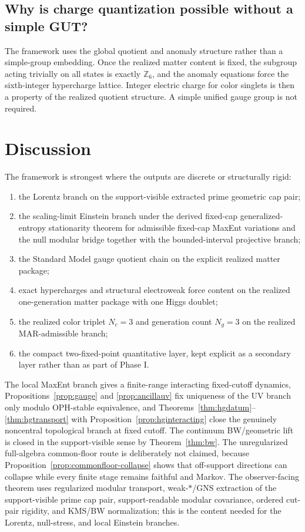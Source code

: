 \documentclass[11pt]{article}
\begin{document}
\subsection{Why is charge quantization possible without a simple GUT?}

The framework uses the global quotient and anomaly structure rather than a simple-group embedding. Once the realized matter content is fixed, the subgroup acting trivially on all states is exactly $\mathbb Z_6$, and the anomaly equations force the sixth-integer hypercharge lattice. Integer electric charge for color singlets is then a property of the realized quotient structure. A simple unified gauge group is not required.

\section{Discussion}

The framework is strongest where the outputs are discrete or structurally rigid:
\begin{enumerate}[leftmargin=2em]
\item the Lorentz branch on the support-visible extracted prime geometric cap pair;
\item the scaling-limit Einstein branch under the derived fixed-cap generalized-entropy stationarity theorem for admissible fixed-cap MaxEnt variations and the null modular bridge together with the bounded-interval projective branch;
\item the Standard Model gauge quotient chain on the explicit realized matter package;
\item exact hypercharges and structural electroweak force content on the realized one-generation matter package with one Higgs doublet;
\item the realized color triplet \(N_c=3\) and generation count \(N_g=3\) on the realized MAR-admissible branch;
\item the compact two-fixed-point quantitative layer, kept explicit as a secondary layer rather than as part of Phase I.
\end{enumerate}

The local MaxEnt branch gives a finite-range interacting fixed-cutoff dynamics, Propositions~\ref{prop:gauge} and \ref{prop:ancillauv} fix uniqueness of the UV branch only modulo OPH-stable equivalence, and Theorems~\ref{thm:hgdatum}--\ref{thm:hgtransport} with Proposition~\ref{prop:hginteracting} close the genuinely noncentral topological branch at fixed cutoff. The continuum BW/geometric lift is closed in the support-visible sense by Theorem~\ref{thm:bw}. The unregularized full-algebra common-floor route is deliberately not claimed, because Proposition~\ref{prop:commonfloor-collapse} shows that off-support directions can collapse while every finite stage remains faithful and Markov. The observer-facing theorem uses regularized modular transport, weak-\(*\)/GNS extraction of the support-visible prime cap pair, support-readable modular covariance, ordered cut-pair rigidity, and KMS/BW normalization; this is the content needed for the Lorentz, null-stress, and local Einstein branches.
\end{document}

